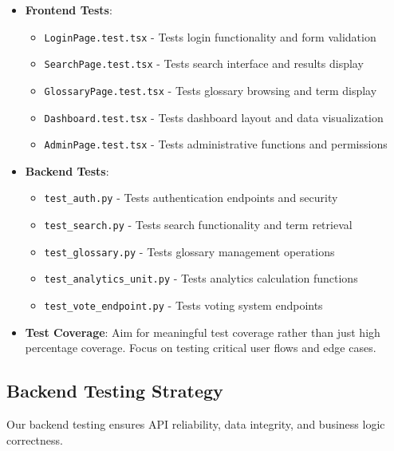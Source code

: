 \documentclass[12pt]{article}
\begin{document}
\begin{itemize}
    \item \textbf{Frontend Tests}:
    \begin{itemize}
        \item \texttt{LoginPage.test.tsx} - Tests login functionality and form validation
        \item \texttt{SearchPage.test.tsx} - Tests search interface and results display
        \item \texttt{GlossaryPage.test.tsx} - Tests glossary browsing and term display
        \item \texttt{Dashboard.test.tsx} - Tests dashboard layout and data visualization
        \item \texttt{AdminPage.test.tsx} - Tests administrative functions and permissions
    \end{itemize}
    
    \item \textbf{Backend Tests}:
    \begin{itemize}
        \item \texttt{test\_auth.py} - Tests authentication endpoints and security
        \item \texttt{test\_search.py} - Tests search functionality and term retrieval
        \item \texttt{test\_glossary.py} - Tests glossary management operations
        \item \texttt{test\_analytics\_unit.py} - Tests analytics calculation functions
        \item \texttt{test\_vote\_endpoint.py} - Tests voting system endpoints
    \end{itemize}
\end{itemize}

\begin{itemize}
    \item \textbf{Test Coverage}: Aim for meaningful test coverage rather than just high percentage coverage. Focus on testing critical user flows and edge cases.
\end{itemize}

\subsection{Backend Testing Strategy}
Our backend testing ensures API reliability, data integrity, and business logic correctness.
\end{document}
